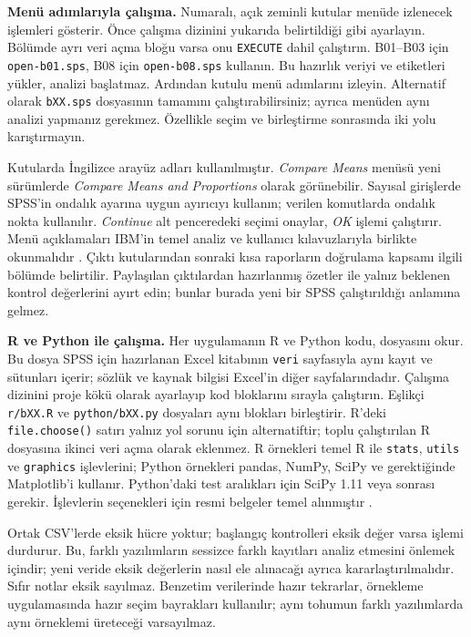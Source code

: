 \textbf{Menü adımlarıyla çalışma.} Numaralı, açık zeminli kutular menüde
izlenecek işlemleri gösterir. Önce çalışma dizinini yukarıda belirtildiği
gibi ayarlayın. Bölümde ayrı veri açma bloğu varsa onu
\texttt{EXECUTE} dahil çalıştırın. B01--B03 için \texttt{open-b01.sps},
B08 için \texttt{open-b08.sps} kullanın. Bu hazırlık veriyi ve etiketleri
yükler, analizi başlatmaz. Ardından kutulu menü adımlarını izleyin.
Alternatif olarak \texttt{bXX.sps} dosyasının
tamamını çalıştırabilirsiniz; ayrıca menüden aynı analizi yapmanız gerekmez.
Özellikle seçim ve birleştirme sonrasında iki yolu karıştırmayın.

Kutularda İngilizce arayüz adları kullanılmıştır. \emph{Compare Means}
menüsü yeni sürümlerde \emph{Compare Means and Proportions} olarak
görünebilir. Sayısal girişlerde SPSS'in ondalık ayarına uygun ayırıcıyı
kullanın; verilen komutlarda ondalık nokta kullanılır. \emph{Continue}
alt penceredeki seçimi onaylar, \emph{OK} işlemi çalıştırır.
Menü açıklamaları IBM'in temel analiz ve kullanıcı kılavuzlarıyla birlikte
okunmalıdır \citep{ibmspssbase,ibmspsscore}. Çıktı kutularından sonraki kısa
raporların doğrulama kapsamı ilgili bölümde belirtilir. Paylaşılan
çıktılardan hazırlanmış özetler ile yalnız beklenen kontrol değerlerini
ayırt edin; bunlar burada yeni bir SPSS çalıştırıldığı anlamına gelmez.


\textbf{R ve Python ile çalışma.} Her uygulamanın R ve Python kodu,
 dosyasını okur. Bu dosya SPSS için
hazırlanan Excel kitabının \texttt{veri} sayfasıyla aynı kayıt ve sütunları
içerir; sözlük ve kaynak bilgisi Excel'in diğer sayfalarındadır. Çalışma
dizinini proje kökü olarak ayarlayıp kod bloklarını sırayla çalıştırın.
Eşlikçi \texttt{r/bXX.R} ve \texttt{python/bXX.py} dosyaları aynı blokları
birleştirir. R'deki \texttt{file.choose()} satırı yalnız yol sorunu için
alternatiftir; toplu çalıştırılan R dosyasına ikinci veri açma olarak eklenmez.
R örnekleri temel R ile \texttt{stats}, \texttt{utils} ve \texttt{graphics}
işlevlerini; Python örnekleri pandas, NumPy, SciPy ve gerektiğinde Matplotlib'i
kullanır. Python'daki test aralıkları için SciPy 1.11 veya sonrası gerekir.
İşlevlerin seçenekleri için resmi belgeler temel alınmıştır
\citep{rstatsmanual,scipystatsmanual}.

Ortak CSV'lerde eksik hücre yoktur; başlangıç kontrolleri eksik değer varsa
işlemi durdurur. Bu, farklı yazılımların sessizce farklı kayıtları analiz
etmesini önlemek içindir; yeni veride eksik değerlerin nasıl ele alınacağı
ayrıca kararlaştırılmalıdır. Sıfır notlar eksik sayılmaz. Benzetim verilerinde
hazır tekrarlar, örnekleme uygulamasında hazır seçim bayrakları kullanılır;
aynı tohumun farklı yazılımlarda aynı örneklemi üreteceği varsayılmaz.

